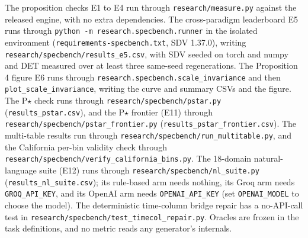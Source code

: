 The proposition checks E1 to E4 run through \texttt{research/\allowbreak{}measure.py}
against the released engine, with no extra dependencies. The
cross-paradigm leaderboard E5 runs through
\texttt{python\ -m\ research.specbench.runner} in the isolated
environment (\texttt{requirements-specbench.txt}, SDV 1.37.0), writing
\texttt{research/\allowbreak{}specbench/\allowbreak{}results\_\allowbreak{}e5.csv}, with SDV seeded on torch
and numpy and DET measured over at least three same-seed regenerations.
The Proposition 4 figure E6 runs through
\texttt{research.specbench.scale\_\allowbreak{}invariance} and then
\texttt{plot\_\allowbreak{}scale\_\allowbreak{}invariance}, writing the curve and summary CSVs and
the figure. The P\ensuremath{\star} check runs through
\texttt{research/\allowbreak{}specbench/\allowbreak{}pstar.py} (\texttt{results\_\allowbreak{}pstar.csv}), and
the P\ensuremath{\star} frontier (E11) through
\texttt{research/\allowbreak{}specbench/\allowbreak{}pstar\_\allowbreak{}frontier.py}
(\texttt{results\_\allowbreak{}pstar\_\allowbreak{}frontier.csv}). The multi-table results run
through \texttt{research/\allowbreak{}specbench/\allowbreak{}run\_\allowbreak{}multitable.py}, and the
California per-bin validity check through
\texttt{research/\allowbreak{}specbench/\allowbreak{}verify\_\allowbreak{}california\_\allowbreak{}bins.py}. The 18-domain
natural-language suite (E12) runs through
\texttt{research/\allowbreak{}specbench/\allowbreak{}nl\_\allowbreak{}suite.py}
(\texttt{results\_\allowbreak{}nl\_\allowbreak{}suite.csv}); its rule-based arm needs nothing, its
Groq arm needs \texttt{GROQ\_\allowbreak{}API\_\allowbreak{}KEY}, and its OpenAI arm needs
\texttt{OPENAI\_\allowbreak{}API\_\allowbreak{}KEY} (set \texttt{OPENAI\_\allowbreak{}MODEL} to choose the
model). The deterministic time-column bridge repair has a no-API-call
test in \texttt{research/\allowbreak{}specbench/\allowbreak{}test\_\allowbreak{}timecol\_\allowbreak{}repair.py}. Oracles
are frozen in the task definitions, and no metric reads any generator's
internals.

